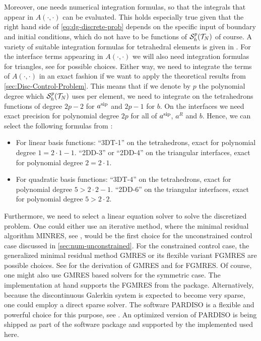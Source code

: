\documentclass[../thesis.tex]{subfiles}
\begin{document}
Moreover, one needs numerical integration formulas, so that the integrals that appear in $A(\cdot, \cdot)$ can be evaluated. This holds especially true given that the right hand side of \cref{eq:dg-discrete-prob} depends on the specific input of boundary and initial conditions, which do not have to be functions of $\mathcal{S}_h^p(\mathcal{T}_N)$ of course.
A variety of suitable integration formulas for tetrahedral elements is given in \cite[Tabelle 4.15, p.\ 314]{JungLanger}. For the interface terms appearing in $A(\cdot, \cdot)$ we will also need integration formulas for triangles, see \cite[Tabelle 4.14, p.\ 313]{JungLanger} for possible choices.
Either way, we need to integrate the terms of $A(\cdot, \cdot)$ in an exact fashion if we want to apply the theoretical results from \cref{sec:Disc-Control-Problem}. This means that if we denote by $p$ the polynomial degree which $\mathcal{S}_h^p(\mathcal{T}_N)$ uses per element, we need to integrate on the tetrahedrons functions of degree $2p - 2$ for $a^{\mathrm{sip}}$ and $2p - 1$ for $b$. On the interfaces we need exact precision for polynomial degree $2p$ for all of $a^{\mathrm{sip}}$, $a^R$ and $b$.
Hence, we can select the following formulas from \cite{JungLanger}:
\begin{itemize}
\item For linear basis functions: ``3DT-1'' on the tetrahedrons, exact for polynomial degree $1 = 2 \cdot 1 - 1$. ``2DD-3'' or ``2DD-4'' on the triangular interfaces, exact for polynomial degree $2 = 2 \cdot 1$.
\item For quadratic basis functions: ``3DT-4'' on the tetrahedrons, exact for polynomial degree $5 > 2 \cdot 2 - 1$. ``2DD-6'' on the triangular interfaces, exact for polynomial degree $5 > 2 \cdot 2$.
\end{itemize}

Furthermore, we need to select a linear equation solver to solve the discretized problem.
One could either use an iterative method, where the minimal residual algorithm MINRES, see \cite{MINRES}, would be the first choice for the unconstrained control case discussed in \cref{sec:num-unconstrained}.
For the constrained control case, the generalized minimal residual method GMRES or its flexible variant FGMRES are possible choices. See \cite{GMRES} for the derivation of GMRES and \cite{FGMRES} for FGMRES.
Of course, one might also use GMRES based solvers for the symmetric case.
The implementation at hand supports the FGMRES from the \cite{MKL} package.
Alternatively, because the discontinuous Galerkin system is expected to become very sparse, one could employ a direct sparse solver.
The software PARDISO is a flexible and powerful choice for this purpose, see \cite{pardiso1,pardiso2,pardiso3}.
An optimized version of PARDISO is being shipped as part of the \cite{MKL} software package and supported by the implemented used here.
\end{document}
